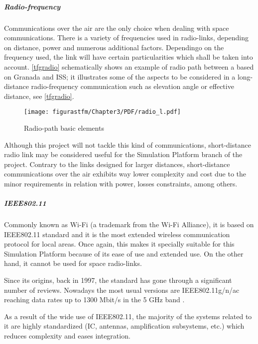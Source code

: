 \subparagraph{Radio-frequency} \label{radiofr}

Communications over the air are the only choice when dealing with space communications. There is a variety of frequencies used in radio-links, depending on distance, power and numerous additional factors. Dependingo on the frequency used, the link will have certain particularities which shall be taken into account. \autoref{tfgradio} schematically shows an example of radio path between a  based on Granada and \acrshort{ISS}; it illustrates some of the aspects to be considered in a long-distance radio-frequency communication such as elevation angle or effective distance, see \autoref{tfgradio}.

			\begin{figure} [H] 				
				\centering
				\texttt{[image: figurastfm/Chapter3/PDF/radio\_l.pdf]}
				\caption{Radio-path basic elements \cite{tfg}} \label{tfgradio}
				\vspace{-0.5cm}
			\end{figure}


Although this project will not tackle this kind of communications, short-distance radio link may be considered useful for the Simulation Platform branch of the project. Contrary to the links designed for larger distances, short-distance communications over the air exhibits way lower complexity and cost due to the minor requirements in relation with power, losses constraints, among others.


\subparagraph{IEEE802.11}

Commonly known as Wi-Fi (a trademark from the Wi-Fi Alliance), it is based on \acrshort{IEEE}802.11 standard and it is the most extended wireless communication protocol for local areas. Once again, this makes it specially suitable for this Simulation Platform because of its ease of use and extended use. On the other hand, it cannot be used for space radio-links.

Since its origins, back in 1997, the standard has gone through a significant number of reviews. Nowadays the most usual versions are \acrshort{IEEE}802.11g/n/ac reaching data rates up to 1300 Mbit/s in the 5 GHz band \cite{wiki}.

As a result of the wide use of \acrshort{IEEE}802.11, the majority of the systems related to it are highly standardized (\acrshort{IC}, antennas, amplification subsystems, etc.) which reduces complexity and eases integration.

